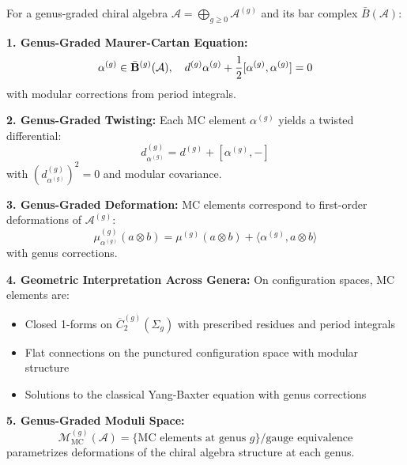 \begin{theorem}
For a genus-graded chiral algebra $\mathcal{A} = \bigoplus_{g \geq 0} \mathcal{A}^{(g)}$ and its bar complex $\bar{B}(\mathcal{A})$:

\textbf{1. Genus-Graded Maurer-Cartan Equation:}
$$\alpha^{(g)} \in \bar{\mathbf{B}}^{(g)}(\mathcal{A}), \quad d^{(g)}\alpha^{(g)} + \frac{1}{2}[\alpha^{(g)}, \alpha^{(g)}] = 0$$
with modular corrections from period integrals.

\textbf{2. Genus-Graded Twisting:}
Each MC element $\alpha^{(g)}$ yields a twisted differential:
$$d_{\alpha^{(g)}}^{(g)} = d^{(g)} + [\alpha^{(g)}, -]$$
with $(d_{\alpha^{(g)}}^{(g)})^2 = 0$ and modular covariance.

\textbf{3. Genus-Graded Deformation:}
MC elements correspond to first-order deformations of $\mathcal{A}^{(g)}$:
$$\mu_{\alpha^{(g)}}^{(g)}(a \otimes b) = \mu^{(g)}(a \otimes b) + \langle \alpha^{(g)}, a \otimes b \rangle$$
with genus corrections.

\textbf{4. Geometric Interpretation Across Genera:}
On configuration spaces, MC elements are:
\begin{itemize}
\item Closed 1-forms on $\overline{C}_2^{(g)}(\Sigma_g)$ with prescribed residues and period integrals
\item Flat connections on the punctured configuration space with modular structure
\item Solutions to the classical Yang-Baxter equation with genus corrections
\end{itemize}

\textbf{5. Genus-Graded Moduli Space:}
$$\mathcal{M}_{\text{MC}}^{(g)}(\mathcal{A}) = \{\text{MC elements at genus } g\}/\text{gauge equivalence}$$
parametrizes deformations of the chiral algebra structure at each genus.
\end{theorem}

